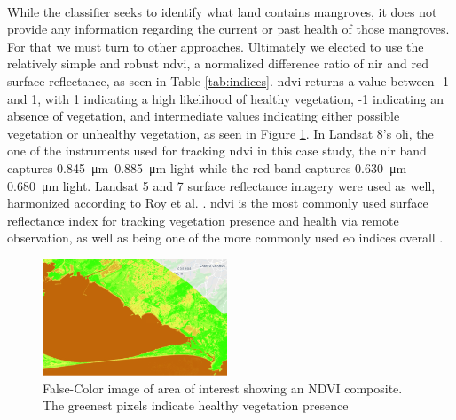 \paragraph{} \label{sec:rio-mangrove-health} \leavevmode\newline

While the classifier seeks to identify what land contains mangroves, it does not provide any information regarding the current or past health of those mangroves. For that we must turn to other approaches. Ultimately we elected to use the relatively simple and robust \ac{ndvi}, a normalized difference ratio of \ac{nir} and red surface reflectance, as seen in Table \ref{tab:indices}. \ac{ndvi} returns a value between -1 and 1, with 1 indicating a high likelihood of healthy vegetation, -1 indicating an absence of vegetation, and intermediate values indicating either possible vegetation or unhealthy vegetation, as seen in Figure \ref{fig:gndvi}. In Landsat 8's \ac{oli}, the one of the instruments used for tracking \ac{ndvi} in this case study, the \ac{nir} band captures \SIrange{0.845}{0.885}{\micro\metre} light while the red band captures \SIrange{0.630}{0.680}{\micro\metre} light. Landsat 5 and 7 surface reflectance imagery were used as well, harmonized according to Roy et al. \cite{royCharacterizationLandsat7Landsat82016}. \ac{ndvi} is the most commonly used surface reflectance index for tracking vegetation presence and health via remote observation, as well as being one of the more commonly used \ac{eo} indices overall \cite{fredenMonitoringVegetationSystems1974,haboudaneHyperspectralVegetationIndices2004, pettorelliUsingSatellitederivedNDVI2005}. 

\begin{figure}[H] 
\centering
\includegraphics[width=0.49\textwidth]{Figures/chap4/guaratiba_ndvi.png}
\caption[False-Color image of area of interest showing an NDVI composite]{False-Color image of area of interest showing an NDVI composite. The greenest pixels indicate healthy vegetation presence}
\label{fig:gndvi}
\end{figure}

